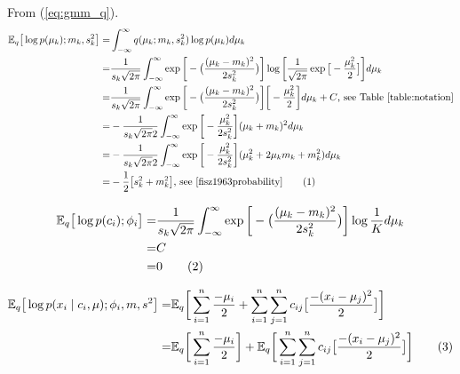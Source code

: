 \documentclass[]{article}
\newcommand{\Expectation} {\mathbb{E}}
\newcommand\numberthis    {\addtocounter{equation}{1}\tag{\theequation}}
\begin{document}
From (\ref{eq:gmm_q}).
\begin{align*}
	 \Expectation_q \big[ \log {p(\mu_k);m_k,s_k^2}\big] =& \int_{-\infty}^{\infty} q(\mu_k;m_k,s_k^2) \log {p(\mu_k)}  d\mu_k\\
	 =& \frac{1}{s_k\sqrt{2\pi}} \int_{-\infty}^{\infty} \exp{\bigg[-\big(\frac{(\mu_k-m_k)^2}{2 s_k^2}\big)\bigg]}\log{\bigg[\frac{1}{\sqrt{2\pi}} \exp{\big[- \frac{\mu_k^2}{2}\big]}\bigg]} d\mu_k\\
	 =&\frac{1}{s_k\sqrt{2\pi}} \int_{-\infty}^{\infty} \exp{\bigg[-\big(\frac{(\mu_k-m_k)^2}{2 s_k^2}\big)\bigg]}\bigg[ - \frac{\mu_k^2}{2}\bigg] d\mu_k+ C \text{, see Table \ref{table:notation}}\\
	 =& - \frac{1}{s_k\sqrt{2\pi} 2 } \int_{-\infty}^{\infty} \exp{\bigg[-\frac{\mu_k^2}{2 s_k^2}\bigg]}(\mu_k+m_k)^2 d\mu_k\\
	 =&- \frac{1}{s_k\sqrt{2\pi} 2 } \int_{-\infty}^{\infty} \exp{\bigg[-\frac{\mu_k^2}{2 s_k^2}\bigg]}(\mu_k^2 +2 \mu_k m_k + m_k^2) d\mu_k\\
	 =&- \frac{1}{2 } \big[s_k^2 +  m_k^2\big] \text{, see  \cite[(5.7.5)]{fisz1963probability}} \numberthis \label{eq:ELBO:1}
\end{align*}

\begin{align*}
	\Expectation_q\big[\log{p(c_i);\phi_i}\big] =& \frac{1}{s_k\sqrt{2\pi}} \int_{-\infty}^{\infty} \exp{\bigg[-\big(\frac{(\mu_k-m_k)^2}{2 s_k^2}\big)\bigg]} \log{\frac{1}{K}} d \mu_k\\
	=& C\\
	=&0 \numberthis \label{eq:ELBO:2}
\end{align*}

\begin{align*}
	\Expectation_q\big[\log{p(x_i\mid c_i,\mu);\phi_i,m,s^2}\big] =& \Expectation_q\bigg[\sum_{i=1}^{n} \frac{-\mu_i}{2}+\sum_{i=1}^{n}\sum_{j=1}^{n} c_{ij}\big[\frac{-(x_i-\mu_j)^2}{2}\big]\bigg]\\
	=&\Expectation_q\bigg[\sum_{i=1}^{n} \frac{-\mu_i}{2}\bigg]+\Expectation_q\bigg[\sum_{i=1}^{n}\sum_{j=1}^{n} c_{ij}\big[\frac{-(x_i-\mu_j)^2}{2}\big]\bigg] \numberthis \label{eq:ELBO:3}
\end{align*}
\end{document}
